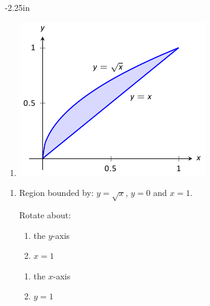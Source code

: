 \clearpage

\begin{adjustwidth*}{}{-2.25in}
\setlength{\columnsep}{25pt}
\begin{multicols*}{2}\small

\begin{enumerate}[1),start=12]
\item \begin{minipage}{\linewidth}\centering\includegraphics{figures/fig07_02_ex_04}\end{minipage}
\end{enumerate}

\vspace{.25cm}


\begin{enumerate}[1),resume]
\item Region bounded by: $y=\sqrt{x}$, $y=0$ and $x=1$.

Rotate about:

\noindent%
\begin{minipage}[t]{.5\linewidth}
\begin{enumerate}
\item		the $y$-axis
\item		$x=1$
\end{enumerate}
\end{minipage}
\begin{minipage}[t]{.5\linewidth}
\begin{enumerate}\addtocounter{enumii}{2}
\item		the $x$-axis
\item		$y=1$
\end{enumerate}
\end{minipage}


\end{enumerate}
\end{multicols*}
\end{adjustwidth*}
